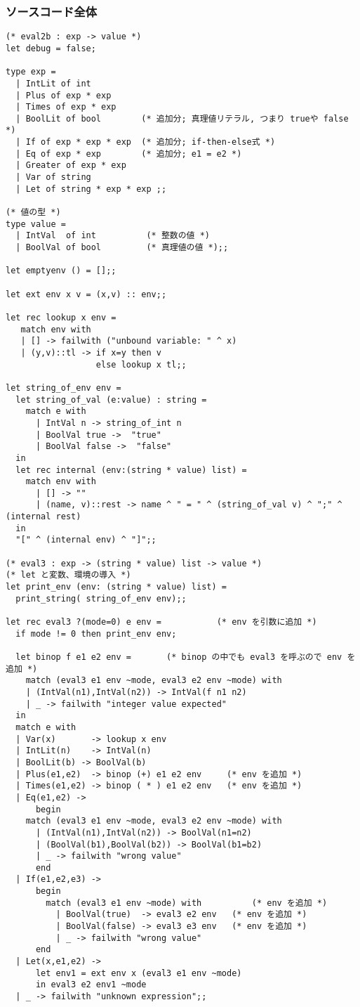 \documentclass[a4paper,9pt]{jarticle}
\begin{document}
\subsubsection{ソースコード全体}
\begin{lstlisting}
(* eval2b : exp -> value *)
let debug = false;

type exp =
  | IntLit of int
  | Plus of exp * exp 
  | Times of exp * exp
  | BoolLit of bool        (* 追加分; 真理値リテラル, つまり trueや false  *)
  | If of exp * exp * exp  (* 追加分; if-then-else式 *)
  | Eq of exp * exp        (* 追加分; e1 = e2 *)
  | Greater of exp * exp 
  | Var of string        
  | Let of string * exp * exp ;;

(* 値の型 *)
type value =
  | IntVal  of int          (* 整数の値 *)
  | BoolVal of bool         (* 真理値の値 *);;

let emptyenv () = [];;

let ext env x v = (x,v) :: env;;

let rec lookup x env =
   match env with
   | [] -> failwith ("unbound variable: " ^ x)
   | (y,v)::tl -> if x=y then v 
                  else lookup x tl;;

let string_of_env env =
  let string_of_val (e:value) : string =
    match e with
      | IntVal n -> string_of_int n
      | BoolVal true ->  "true"
      | BoolVal false ->  "false"
  in
  let rec internal (env:(string * value) list) =
    match env with
      | [] -> ""
      | (name, v)::rest -> name ^ " = " ^ (string_of_val v) ^ ";" ^ (internal rest)
  in
  "[" ^ (internal env) ^ "]";;

(* eval3 : exp -> (string * value) list -> value *)
(* let と変数、環境の導入 *)
let print_env (env: (string * value) list) =
  print_string( string_of_env env);;

let rec eval3 ?(mode=0) e env =           (* env を引数に追加 *)
  if mode != 0 then print_env env;

  let binop f e1 e2 env =       (* binop の中でも eval3 を呼ぶので env を追加 *)
    match (eval3 e1 env ~mode, eval3 e2 env ~mode) with
    | (IntVal(n1),IntVal(n2)) -> IntVal(f n1 n2)
    | _ -> failwith "integer value expected"
  in 
  match e with
  | Var(x)       -> lookup x env
  | IntLit(n)    -> IntVal(n)
  | BoolLit(b) -> BoolVal(b)
  | Plus(e1,e2)  -> binop (+) e1 e2 env     (* env を追加 *)
  | Times(e1,e2) -> binop ( * ) e1 e2 env   (* env を追加 *)
  | Eq(e1,e2) ->
      begin
	match (eval3 e1 env ~mode, eval3 e2 env ~mode) with
	  | (IntVal(n1),IntVal(n2)) -> BoolVal(n1=n2)
	  | (BoolVal(b1),BoolVal(b2)) -> BoolVal(b1=b2)
	  | _ -> failwith "wrong value"
      end
  | If(e1,e2,e3) ->
      begin
        match (eval3 e1 env ~mode) with          (* env を追加 *)
          | BoolVal(true)  -> eval3 e2 env   (* env を追加 *)
          | BoolVal(false) -> eval3 e3 env   (* env を追加 *)
          | _ -> failwith "wrong value"
      end
  | Let(x,e1,e2) -> 
      let env1 = ext env x (eval3 e1 env ~mode)
      in eval3 e2 env1 ~mode
  | _ -> failwith "unknown expression";;



\end{lstlisting}
\end{document}
